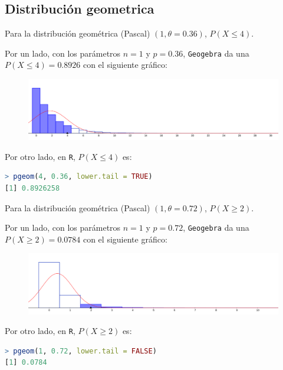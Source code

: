 \subsection{Distribución geometrica}
\begin{ejer}[0,25]
	 Para la distribución geométrica (Pascal) $(1, \theta = 0.36)$, $P(X \leq 4)$.
\end{ejer}
\begin{sol}
	Por un lado, con los parámetros $n=1$ y $p=0.36$, \texttt{Geogebra} da una $P(X\leq 4) = 0.8926$ con el siguiente gráfico:
	\begin{figure}[H]
	\includegraphics[width=0.5\linewidth]{pics/g6}
	\centering
	\end{figure}\noindent
	Por otro lado, en \texttt{R}, $P(X\leq 4)$ es:
	\begin{lstlisting}[language=R]
> pgeom(4, 0.36, lower.tail = TRUE)
[1] 0.8926258
	\end{lstlisting}
\end{sol}
\begin{ejer}[0,25]
	 Para la distribución geométrica (Pascal) $(1, \theta = 0.72)$, $P(X\geq 2)$.
\end{ejer}
\begin{sol}
	Por un lado, con los parámetros $n=1$ y $p=0.72$, \texttt{Geogebra} da una $P(X\geq 2) = 0.0784$ con el siguiente gráfico:
	\begin{figure}[H]
	\includegraphics[width=0.5\linewidth]{pics/g7}
	\centering
	\end{figure}\noindent
	Por otro lado, en \texttt{R}, $P(X\geq 2)$ es:
	\begin{lstlisting}[language=R]
> pgeom(1, 0.72, lower.tail = FALSE)
[1] 0.0784
	\end{lstlisting}
\end{sol}

